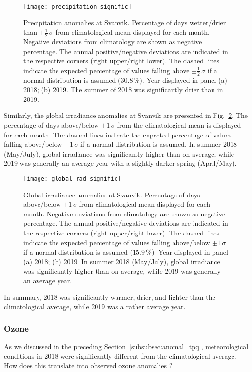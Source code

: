 \documentclass[bg, manuscript]{copernicus}
\begin{document}
\begin{figure}[t]
  \texttt{[image: precipitation\_signific]}
  \caption{Precipitation anomalies at Svanvik. Percentage of days wetter/drier than $\pm \frac{1}{2}\,\sigma$ from climatological mean displayed for each month. Negative deviations from climatology are shown as negative percentage. The annual positive/negative deviations are indicated in the respective corners (right upper/right lower). The dashed lines indicate the expected percentage of values falling above $\pm\frac{1}{2}\,\sigma$ if a normal distribution is assumed ($30.8\,\unit{\%}$). Year displayed in panel (a) 2018; (b) 2019. The summer of 2018 was significantly drier than in 2019.}
  \label{fig:plot_precipitation_anomalies_svanvik}
\end{figure}

Similarly, the global irradiance anomalies at Svanvik are presented in Fig.~\ref{fig:global_rad_signific}. The percentage of days above/below $\pm 1\,\sigma$ from the climatological mean is displayed for each month. The dashed lines indicate the expected percentage of values falling above/below $\pm 1\,\sigma$ if a normal distribution is assumed. In summer 2018 (May/July), global irradiance was significantly higher than on average, while 2019 was generally an average year with a slightly darker spring (April/May).

\begin{figure}[t]
  \texttt{[image: global\_rad\_signific]}
  \caption{Global irradiance anomalies at Svanvik. Percentage of days above/below $\pm 1\,\sigma$ from climatological mean displayed for each month. Negative deviations from climatology are shown as negative percentage. The annual positive/negative deviations are indicated in the respective corners (right upper/right lower). The dashed lines indicate the expected percentage of values falling above/below $\pm 1\,\sigma$ if a normal distribution is assumed ($15.9\,\unit{\%}$). Year displayed in panel (a) 2018; (b) 2019. In summer 2018 (May/July), global irradiance was significantly higher than on average, while 2019 was generally an average year.}
  \label{fig:global_rad_signific}
\end{figure}

In summary, 2018 was significantly warmer, drier, and lighter than the climatological average, while 2019 was a rather average year.

\subsubsection{Ozone}
\label{subsubsec:anomal_ozone}
As we discussed in the preceding Section~\ref{subsubsec:anomal_tpq}, meteorological conditions in 2018 were significantly different from the climatological average. How does this translate into observed ozone anomalies \chem{\Delta[O_3]}?
\end{document}

